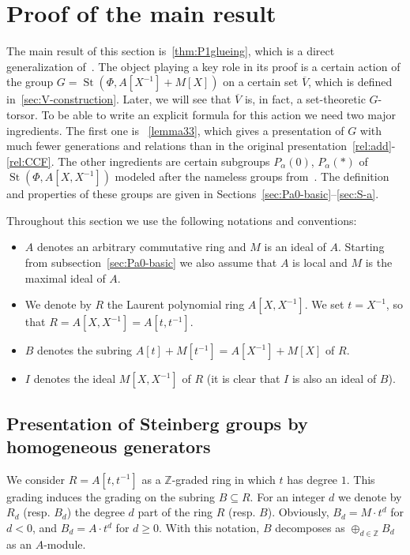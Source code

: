 \documentclass[oneside, 8pt]{amsart}
\theoremstyle{remark}
\theoremstyle{definition}
\numberwithin{lemma}{section}
\numberwithin{prop}{section}
\numberwithin{corollary}{section}
\numberwithin{externaltheorem}{section}
\DeclareMathOperator{\St}{St}
\newcommand{\inv}{^{-1}}
\numberwithin{equation}{section}
\begin{document}
\section{Proof of the main result}
The main result of this section is~\cref{thm:P1glueing}, which is a direct generalization of~\cite[Proposition~4.3]{Tu83}. 
The object playing a key role in its proof is a certain action of the group $G = \St(\Phi, A[X\inv] + M[X])$ on a certain set $\overline{V}$, which is defined in~\cref{sec:V-construction}. Later, we will see that $\overline{V}$ is, in fact, a set-theoretic $G$-torsor.
To be able to write an explicit formula for this action we need two major ingredients. The first one is ~\cref{lemma33}, which gives a presentation of $G$ with much fewer generations and relations than in the original presentation~\eqref{rel:add}-\eqref{rel:CCF}. The other ingredients are certain subgroups $P_\alpha(0)$, $P_\alpha(*)$ of $\St(\Phi, A[X, X\inv])$ modeled after the nameless groups from~\cite[Lemma~3.4]{Tu83}. The definition and properties of these groups are given in Sections~\ref{sec:Pa0-basic}--\ref{sec:S-a}.

Throughout this section we use the following notations and conventions:
\begin{itemize}
 \item $A$ denotes an arbitrary commutative ring and $M$ is an ideal of $A$. Starting from subsection~\ref{sec:Pa0-basic} we also assume that $A$ is local and $M$ is the maximal ideal of $A$.
 \item We denote by $R$ the Laurent polynomial ring $A[X, X^{-1}]$. We set $t = X^{-1}$, so that $R = A[X, X^{-1}] = A[t, t^{-1}]$.
 \item $B$ denotes the subring $A[t] + M[t^{-1}] = A[X^{-1}] + M[X]$ of $R$.
 \item $I$ denotes the ideal $M[X, X^{-1}]$ of $R$ (it is clear that $I$ is also an ideal of $B$).
 \end{itemize}
\subsection{Presentation of Steinberg groups by homogeneous generators}
\label{sec:presentation}
We consider $R = A[t, t\inv]$ as a $\mathbb{Z}$-graded ring in which $t$ has degree $1$. This grading induces the grading on the subring $B \subseteq R$. For an integer $d$ we denote by $R_d$ (resp. $B_d$) the degree $d$ part of the ring $R$ (resp. $B$). Obviously, $B_d=M \cdot t^d$ for $d<0$, and $B_d=A \cdot t^d$ for $d\geq0$. With this notation, $B$ decomposes as $\oplus_{d\in\mathbb Z}B_d$ as an $A$-module. 
\end{document}

